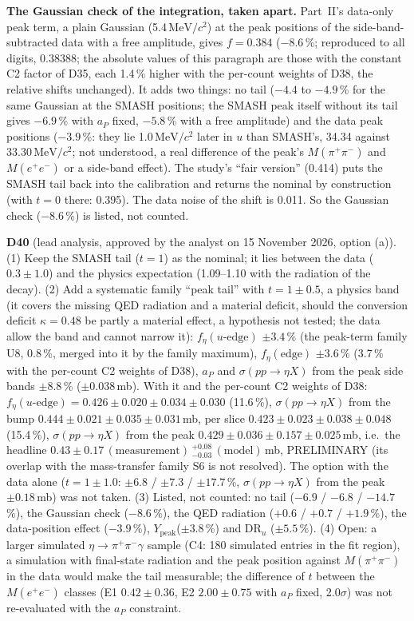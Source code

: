 \documentclass[11pt,a4paper]{article}
\newcommand{\pipi}{\ensuremath{\pi^{+}\pi^{-}}\xspace}
\newcommand{\Mee}{\ensuremath{M(e^{+}e^{-})}\xspace}
\newcommand{\Mpipi}{\ensuremath{M(\pi^{+}\pi^{-})}\xspace}
\newcommand{\MeVcc}{\ensuremath{\mathrm{MeV}/c^{2}}\xspace}
\newcommand{\aP}{\ensuremath{a_P}\xspace}
\newcommand{\Ypeak}{\ensuremath{Y_{\mathrm{peak}}}\xspace}
\newcommand{\sigeta}{\ensuremath{\sigma(pp\to\eta X)}\xspace}
\newcommand{\notebox}[1]{\par\noindent\colorbox{orange!10}{\parbox{\dimexpr\linewidth-2\fboxsep\relax}{#1}}\par}
\begin{document}
\textbf{The Gaussian check of the integration, taken apart.} Part~II's data-only peak term, a plain Gaussian (5.4\,\MeVcc) at the peak positions
of the side-band-subtracted data with a free amplitude, gives $f=0.384$ ($-8.6$\,\%; reproduced to all digits, 0.38388; the absolute values of this paragraph are those with the constant C2 factor of D35, each 1.4\,\% higher with the per-count weights of D38, the relative shifts unchanged). It adds two things:
no tail ($-4.4$ to $-4.9$\,\% for the same Gaussian at the SMASH positions; the SMASH peak itself without its tail gives $-6.9$\,\% with \aP
fixed, $-5.8$\,\% with a free amplitude) and the data peak positions ($-3.9$\,\%: they lie 1.0\,\MeVcc
later in $u$ than SMASH's, 34.34 against 33.30\,\MeVcc; not understood, a real difference of the peak's \Mpipi and \Mee or a side-band effect).
The study's ``fair version'' (0.414) puts the SMASH tail back into the
calibration and returns the nominal by construction (with $t=0$ there: 0.395). The data noise of the shift is 0.011. So the Gaussian check ($-8.6$\,\%) is listed, not
counted.



\notebox{\textbf{D40} (lead analysis, approved by the analyst on 15 November 2026, option (a)). (1) Keep the SMASH tail ($t=1$) as the
nominal; it lies between the data ($0.3\pm1.0$) and the physics expectation (1.09--1.10 with the radiation of the decay). (2) Add a systematic
family ``peak tail'' with $t=1\pm0.5$, a physics band (it covers the missing QED radiation and a material deficit, should the conversion deficit
$\kappa=0.48$ be partly a material effect, a hypothesis not tested; the data allow the band and cannot narrow it): $f_\eta(u\text{-edge})$
$\pm3.4$\,\% (the peak-term family U8, 0.8\,\%, merged into it by the family maximum), $f_\eta(\mathrm{edge})$ $\pm3.6$\,\% (3.7\,\% with the per-count C2
weights of D38), \aP and \sigeta from the peak side bands $\pm8.8$\,\% ($\pm0.038$\,mb). With it and the per-count C2 weights of D38:
$f_\eta(u\text{-edge})=0.426\pm0.020\pm0.034\pm0.030$ (11.6\,\%), \sigeta from the bump $0.444\pm0.021\pm0.035\pm0.031$\,mb, per slice
$0.423\pm0.023\pm0.038\pm0.048$ (15.4\,\%), \sigeta from the peak $0.429\pm0.036\pm0.157\pm0.025$\,mb, i.e.\ the headline
$0.43\pm0.17\,(\mathrm{measurement})\,^{+0.08}_{-0.03}\,(\mathrm{model})$\,mb, PRELIMINARY (its overlap with the mass-transfer family S6 is not
resolved). The option with the data alone ($t=1\pm1.0$: $\pm6.8$ / $\pm7.3$ / $\pm17.7$\,\%, \sigeta from the peak $\pm0.18$\,mb) was not taken.
(3) Listed, not counted: no tail ($-6.9$ / $-6.8$ / $-14.7$\,\%), the Gaussian check ($-8.6$\,\%), the QED radiation ($+0.6$ / $+0.7$ / $+1.9$\,\%), the data-position effect
($-3.9$\,\%), \Ypeak ($\pm3.8$\,\%) and DR$_u$ ($\pm5.5$\,\%). (4) Open: a larger simulated $\eta\to\pipi\gamma$ sample (C4: 180 simulated entries in the fit
region), a simulation with final-state radiation and the peak position against \Mpipi in the data would make the tail measurable; the
difference of $t$ between the \Mee classes (E1 $0.42\pm0.36$, E2 $2.00\pm0.75$ with \aP fixed, 2.0$\sigma$) was not re-evaluated with the \aP
constraint.}
\end{document}
